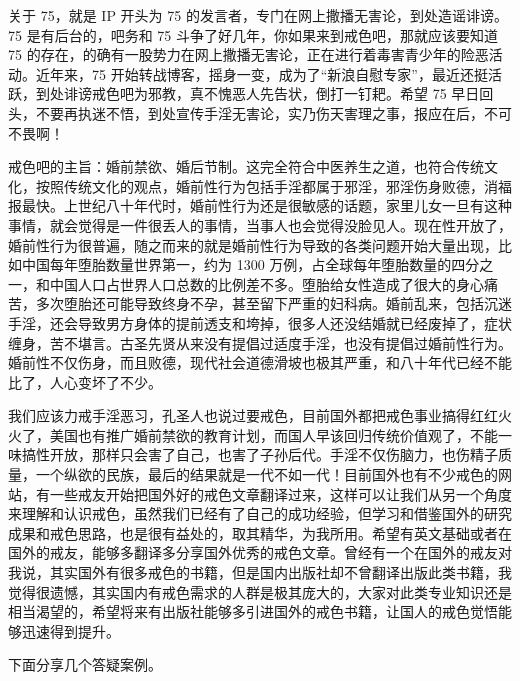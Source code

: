 关于 75，就是 IP 开头为 75 的发言者，专门在网上撒播无害论，到处造谣诽谤。75 是有后台的，吧务和 75 斗争了好几年，你如果来到戒色吧，那就应该要知道 75 的存在，的确有一股势力在网上撒播无害论，正在进行着毒害青少年的险恶活动。近年来，75 开始转战博客，摇身一变，成为了“新浪自慰专家”，最近还挺活跃，到处诽谤戒色吧为邪教，真不愧恶人先告状，倒打一钉耙。希望 75 早日回头，不要再执迷不悟，到处宣传手淫无害论，实乃伤天害理之事，报应在后，不可不畏啊！

戒色吧的主旨：婚前禁欲、婚后节制。这完全符合中医养生之道，也符合传统文化，按照传统文化的观点，婚前性行为包括手淫都属于邪淫，邪淫伤身败德，消福报最快。上世纪八十年代时，婚前性行为还是很敏感的话题，家里儿女一旦有这种事情，就会觉得是一件很丢人的事情，当事人也会觉得没脸见人。现在性开放了，婚前性行为很普遍，随之而来的就是婚前性行为导致的各类问题开始大量出现，比如中国每年堕胎数量世界第一，约为 1300 万例，占全球每年堕胎数量的四分之一，和中国人口占世界人口总数的比例差不多。堕胎给女性造成了很大的身心痛苦，多次堕胎还可能导致终身不孕，甚至留下严重的妇科病。婚前乱来，包括沉迷手淫，还会导致男方身体的提前透支和垮掉，很多人还没结婚就已经废掉了，症状缠身，苦不堪言。古圣先贤从来没有提倡过适度手淫，也没有提倡过婚前性行为。婚前性不仅伤身，而且败德，现代社会道德滑坡也极其严重，和八十年代已经不能比了，人心变坏了不少。

我们应该力戒手淫恶习，孔圣人也说过要戒色，目前国外都把戒色事业搞得红红火火了，美国也有推广婚前禁欲的教育计划，而国人早该回归传统价值观了，不能一味搞性开放，那样只会害了自己，也害了子孙后代。手淫不仅伤脑力，也伤精子质量，一个纵欲的民族，最后的结果就是一代不如一代！目前国外也有不少戒色的网站，有一些戒友开始把国外好的戒色文章翻译过来，这样可以让我们从另一个角度来理解和认识戒色，虽然我们已经有了自己的成功经验，但学习和借鉴国外的研究成果和戒色思路，也是很有益处的，取其精华，为我所用。希望有英文基础或者在国外的戒友，能够多翻译多分享国外优秀的戒色文章。曾经有一个在国外的戒友对我说，其实国外有很多戒色的书籍，但是国内出版社却不曾翻译出版此类书籍，我觉得很遗憾，其实国内有戒色需求的人群是极其庞大的，大家对此类专业知识还是相当渴望的，希望将来有出版社能够多引进国外的戒色书籍，让国人的戒色觉悟能够迅速得到提升。

下面分享几个答疑案例。

